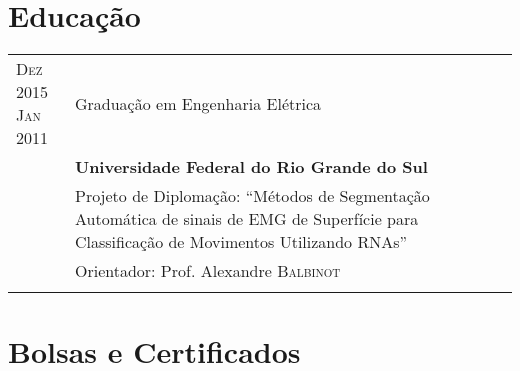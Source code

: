 \documentclass[a4paper,10pt]{article} %
\begin{document}

\section{Educação}

\begin{tabular}{p{1.5cm}|p{12cm}}

\pbox{20cm}{\textsc{Dez} 2015 \\ \textsc{Jan} 2011} & Graduação em Engenharia Elétrica\\
& \textbf{Universidade Federal do Rio Grande do Sul}\\
& \footnotesize{Projeto de Diplomação: ``Métodos de Segmentação Automática de sinais de EMG de Superfície para Classificação de Movimentos Utilizando RNAs''} \\
& \small Orientador: Prof. Alexandre \textsc{Balbinot}\\
\multicolumn{2}{c}{} \\

\end{tabular}


\section{Bolsas e Certificados}
\end{document}
